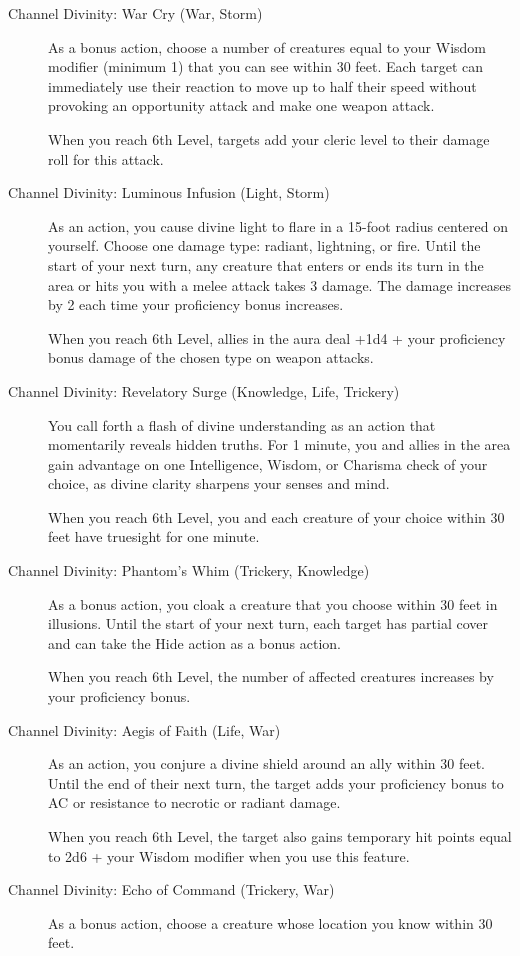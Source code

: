 \begin{description}
\item[Channel Divinity: War Cry (War, Storm)]
As a bonus action, choose a number of creatures equal to your Wisdom
modifier (minimum 1) that you can see within 30 feet. Each target can
immediately use their reaction to move up to half their speed without
provoking an opportunity attack and make one weapon attack.

When you reach 6th Level, targets add your cleric level to their damage
roll for this attack.
\item[Channel Divinity: Luminous Infusion (Light, Storm)]
As an action, you cause divine light to flare in a 15-foot radius
centered on yourself. Choose one damage type: radiant, lightning, or
fire. Until the start of your next turn, any creature that enters or
ends its turn in the area or hits you with a melee attack takes 3
damage. The damage increases by 2 each time your proficiency bonus
increases.

When you reach 6th Level, allies in the aura deal +1d4 + your
proficiency bonus damage of the chosen type on weapon attacks.
\item[Channel Divinity: Revelatory Surge (Knowledge, Life, Trickery)]
You call forth a flash of divine understanding as an action that
momentarily reveals hidden truths. For 1 minute, you and allies in the
area gain advantage on one Intelligence, Wisdom, or Charisma check of
your choice, as divine clarity sharpens your senses and mind.

When you reach 6th Level, you and each creature of your choice within 30
feet have truesight for one minute.
\item[Channel Divinity: Phantom's Whim (Trickery, Knowledge)]
As a bonus action, you cloak a creature that you choose within 30 feet
in illusions. Until the start of your next turn, each target has partial
cover and can take the Hide action as a bonus action.

When you reach 6th Level, the number of affected creatures increases by
your proficiency bonus.
\item[Channel Divinity: Aegis of Faith (Life, War)]
As an action, you conjure a divine shield around an ally within 30 feet.
Until the end of their next turn, the target adds your proficiency bonus
to AC or resistance to necrotic or radiant damage.

When you reach 6th Level, the target also gains temporary hit points
equal to 2d6 + your Wisdom modifier when you use this feature.
\item[Channel Divinity: Echo of Command (Trickery, War)]
As a bonus action, choose a creature whose location you know within 30
feet.


\end{description}
